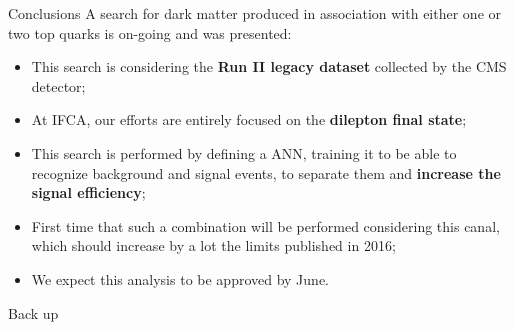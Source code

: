 \documentclass[8pt]{beamer}
\newcommand{\backupbegin}{
   \newcounter{finalframe}
   \setcounter{finalframe}{\value{framenumber}}
}
\begin{document}
\begin{frame}{Conclusions}
\justifying
A search for \alert{dark matter produced in association with either one or two top quarks} is on-going and was presented:

\begin{itemize}
\justifying
\item This search is considering the \textbf{Run II legacy dataset} collected by the CMS detector;
\item At IFCA, our efforts are entirely focused on the \textbf{dilepton final state};
\item This search is performed by defining a ANN, training it to be able to recognize background and signal events, to separate them and \textbf{increase the signal efficiency};
\item First time that such a combination will be performed considering this canal, which should increase by a lot the limits published in 2016; 
\item We expect this analysis \alert{to be approved by June}.
\end{itemize}
\end{frame}

























\backupbegin

\begin{frame}[standout]
Back up
\end{frame}
\end{document}
